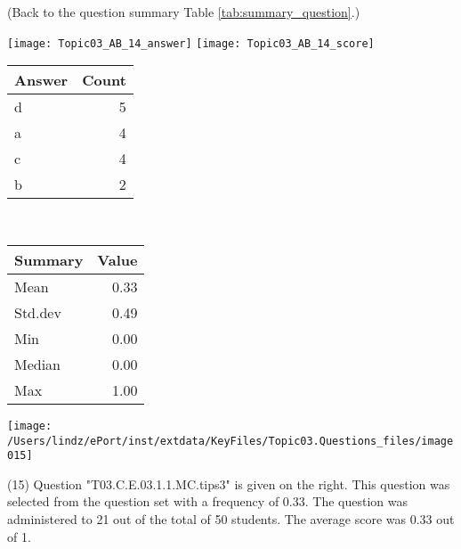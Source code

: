 \documentclass[12pt,english,nohyper]{tufte-handout}\usepackage[]{graphicx}\usepackage[]{color}
\begin{document}
 (Back to the question summary Table \ref{tab:summary_question}.)

\begin{center} \texttt{[image: Topic03\_AB\_14\_answer]} \texttt{[image: Topic03\_AB\_14\_score]} \end{center} 

\begin{center}%
\begin{tabular}{lr}
  \hline
Answer & Count \\ 
  \hline
d &   5 \\ 
  a &   4 \\ 
  c &   4 \\ 
  b &   2 \\ 
   \hline
\end{tabular}
~~~~~~~~%
\begin{tabular}{lr}
  \hline
Summary & Value \\ 
  \hline
Mean & 0.33 \\ 
  Std.dev & 0.49 \\ 
  Min & 0.00 \\ 
  Median & 0.00 \\ 
  Max & 1.00 \\ 
   \hline
\end{tabular}
\end{center}\newpage{}



\vspace{4cm}\begin{marginfigure}\texttt{[image: /Users/lindz/ePort/inst/extdata/KeyFiles/Topic03.Questions\_files/image015]}\end{marginfigure}\vspace{-4cm} (15) Question "T03.C.E.03.1.1.MC.tips3" is given on the right. This question was selected from the question set with a frequency of 0.33. The question was administered to 21 out of the total of 50 students. The average score was 0.33 out of 1.
\end{document}
